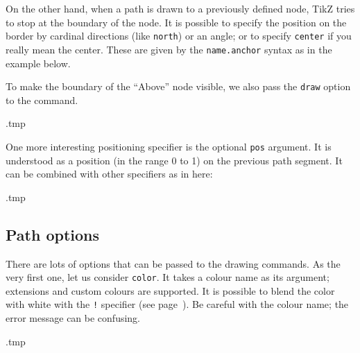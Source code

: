 On the other hand, when a path is drawn to a previously defined node,
TikZ tries to stop at the boundary of the node.
It is possible to specify the position on the border by cardinal directions (like \verb|north|)
or an angle; or to specify \verb|center| if you really mean the center.
These are given by the \verb|name.anchor| syntax as in the example below.

To make the boundary of the ``Above'' node visible,
we also pass the \verb|draw| option to the  command.
%
\begin{VerbatimOut}{\jobname.tmp}
\end{VerbatimOut}
\ShowExample

One more interesting positioning specifier is the optional \verb|pos| argument.
It is understood as a position (in the range 0 to 1) on the previous path segment.
It can be combined with other specifiers as in here:
%
\begin{VerbatimOut}{\jobname.tmp}
\end{VerbatimOut}
\ShowExample


%
%
\subsection{Path options}

There are lots of options that can be passed to the drawing commands.
As the very first one, let us consider \verb|color|.
It takes a colour name as its argument;
 extensions and custom colours are supported.
It is possible to blend the color with white with the \verb|!| specifier
(see page~\pageref{ex:color blending}).
Be careful with the colour name; the error message can be confusing.
%
\begin{VerbatimOut}{\jobname.tmp}
\end{VerbatimOut}
\ShowExample

